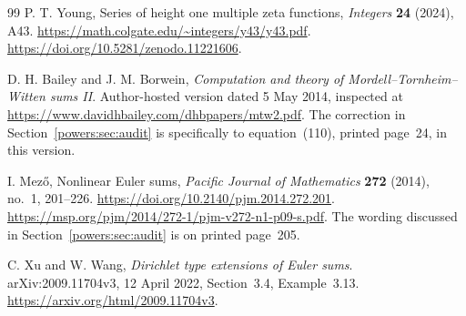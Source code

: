 \begin{thebibliography}{99}
P. T. Young,
Series of height one multiple zeta functions,
\emph{Integers} \textbf{24} (2024), A43.
\url{https://math.colgate.edu/~integers/y43/y43.pdf}.
\url{https://doi.org/10.5281/zenodo.11221606}.

D. H. Bailey and J. M. Borwein,
\emph{Computation and theory of Mordell--Tornheim--Witten sums II}.
Author-hosted version dated 5 May 2014, inspected at
\url{https://www.davidhbailey.com/dhbpapers/mtw2.pdf}.
The correction in Section~\ref{powers:sec:audit} is specifically to
equation~(110), printed page~24, in this version.

I. Mez\H{o}, Nonlinear Euler sums,
\emph{Pacific Journal of Mathematics} \textbf{272} (2014), no.~1,
201--226.
\url{https://doi.org/10.2140/pjm.2014.272.201}.
\url{https://msp.org/pjm/2014/272-1/pjm-v272-n1-p09-s.pdf}.
The wording discussed in Section~\ref{powers:sec:audit} is on
printed page~205.

C. Xu and W. Wang,
\emph{Dirichlet type extensions of Euler sums}.
arXiv:2009.11704v3, 12 April 2022,
Section~3.4, Example~3.13.
\url{https://arxiv.org/html/2009.11704v3}.

\end{thebibliography}

